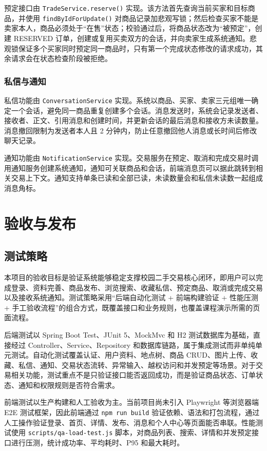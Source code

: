 ﻿\documentclass[UTF8,a4paper,12pt]{ctexart}
\begin{document}
预定接口由 \texttt{TradeService.reserve()} 实现。该方法首先查询当前买家和目标商品，并使用 \texttt{findByIdForUpdate()} 对商品记录加悲观写锁；然后检查买家不能是卖家本人，商品必须处于“在售”状态；校验通过后，将商品状态改为“被预定”，创建 RESERVED 订单，创建或复用买卖双方的会话，并向卖家生成系统通知。悲观锁保证多个买家同时预定同一商品时，只有第一个完成状态修改的请求成功，其余请求会在状态检查阶段被拒绝。

\subsubsection{私信与通知}
私信功能由 \texttt{ConversationService} 实现。系统以商品、买家、卖家三元组唯一确定一个会话，避免同一商品重复创建多个会话。消息发送时，系统会记录发送者、接收者、正文、引用消息和创建时间，并更新会话的最后消息和接收方未读数量。消息撤回限制为发送者本人且 2 分钟内，防止任意撤回他人消息或长时间后修改聊天记录。

通知功能由 \texttt{NotificationService} 实现。交易服务在预定、取消和完成交易时调用通知服务创建系统通知，通知可关联商品和会话，前端消息页可以据此跳转到相关交易上下文。通知支持单条已读和全部已读，未读数量会和私信未读数一起组成消息角标。

\section{验收与发布}

\subsection{测试策略}
本项目的验收目标是验证系统能够稳定支撑校园二手交易核心闭环，即用户可以完成登录、资料完善、商品发布、浏览搜索、收藏私信、预定商品、取消或完成交易以及接收系统通知。测试策略采用“后端自动化测试 + 前端构建验证 + 性能压测 + 手工验收流程”的组合方式，既覆盖接口和业务规则，也覆盖课程演示所需的页面流程。

后端测试以 Spring Boot Test、JUnit 5、MockMvc 和 H2 测试数据库为基础，直接经过 Controller、Service、Repository 和数据库链路，属于集成测试而非单纯单元测试。自动化测试覆盖认证、用户资料、地点树、商品 CRUD、图片上传、收藏、私信、通知、交易状态流转、异常输入、越权访问和并发预定等场景。对于交易相关功能，测试重点不是只验证接口能否返回成功，而是验证商品状态、订单状态、通知和权限规则是否符合需求。

前端测试以生产构建和人工验收为主。当前项目尚未引入 Playwright 等浏览器端 E2E 测试框架，因此前端通过 \texttt{npm run build} 验证依赖、语法和打包流程，通过人工操作验证登录、首页、详情、发布、消息和个人中心等页面能否串联。性能测试使用 \texttt{scripts/qa-load-test.js} 脚本，对商品列表、搜索、详情和并发预定接口进行压测，统计成功率、平均耗时、P95 和最大耗时。
\end{document}
